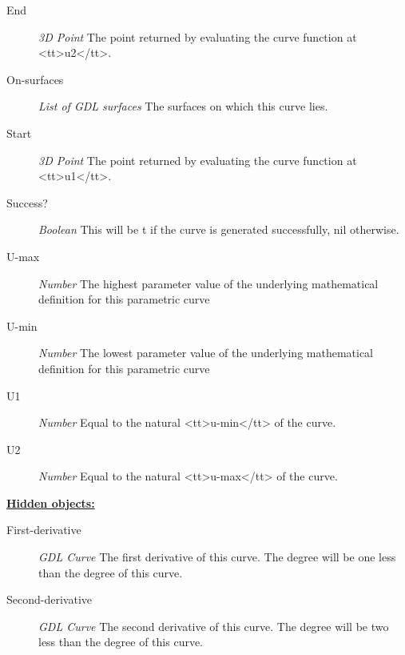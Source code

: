 \documentclass [11pt]{book}
\begin{document}
\begin{itemize}
\begin{description}
\item [End]
\emph{3D Point} The point returned by evaluating the curve function at <tt>u2</tt>.


\item [On-surfaces]
\emph{List of GDL surfaces} The surfaces on which this curve lies.


\item [Start]
\emph{3D Point} The point returned by evaluating the curve function at <tt>u1</tt>.


\item [Success?]
\emph{Boolean} This will be t if the curve is generated successfully, nil otherwise.


\item [U-max]
\emph{Number} The highest parameter value of the underlying mathematical definition for this parametric curve


\item [U-min]
\emph{Number} The lowest parameter value of the underlying mathematical definition for this parametric curve


\item [U1]
\emph{Number} Equal to the natural <tt>u-min</tt> of the curve.


\item [U2]
\emph{Number} Equal to the natural <tt>u-max</tt> of the curve.


\end{description}






\textbf{
\underline{Hidden objects:}}

\begin{description}

\item [First-derivative]
\emph{GDL Curve} The first derivative of this curve. The degree will be one less than the degree of this curve.


\item [Second-derivative]
\emph{GDL Curve} The second derivative of this curve. The degree will be two less than the degree of this curve.


\end{description}







\end{itemize}
\end{document}
